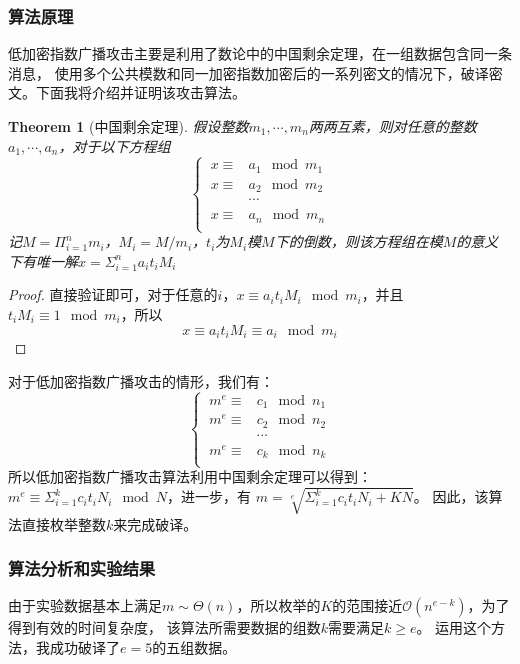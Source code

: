 \documentclass{ctexart}
\newtheorem{theorem}{Theorem}
\begin{document}
\subsubsection{算法原理}
低加密指数广播攻击主要是利用了数论中的中国剩余定理，在一组数据包含同一条消息，
使用多个公共模数和同一加密指数加密后的一系列密文的情况下，破译密文。下面我将介绍并证明该攻击算法。
\begin{theorem}[中国剩余定理]
    假设整数$m_1,\cdots,m_n$两两互素，则对任意的整数$a_1,\cdots,a_n$，对于以下方程组
    \begin{equation*}
        \begin{cases}
        \ x\equiv& a_1 \mod m_1\\
        \ x\equiv& a_2  \mod m_2 \\
        &\cdots\\
        \ x\equiv& a_n \mod m_n  \\
        \end{cases} 
    \end{equation*}
    记$M=\Pi_{i=1}^nm_i$，$M_i=M/m_i$，$t_i$为$M_i$模$M$下的倒数，则该方程组在模$M$的意义下有唯一解$x=\Sigma_{i=1}^na_it_iM_i$
\end{theorem}
\begin{proof}
    直接验证即可，对于任意的$i$，$x\equiv a_it_iM_i\mod m_i$，并且$t_iM_i\equiv 1 \mod m_i$，所以
    $$
    x\equiv a_it_iM_i\equiv a_i  \mod m_i
    $$
\end{proof}
对于低加密指数广播攻击的情形，我们有：
\begin{equation*}
    \begin{cases}
    \ m^e\equiv& c_1 \mod n_1\\
    \ m^e\equiv& c_2  \mod n_2 \\
    &\cdots\\
    \ m^e\equiv& c_k \mod n_k  \\
    \end{cases} 
\end{equation*}
所以低加密指数广播攻击算法利用中国剩余定理可以得到：
$m^e\equiv\Sigma_{i=1}^kc_it_iN_i\mod N$，进一步，有
$m=\sqrt[e]{\Sigma_{i=1}^kc_it_iN_i + KN}$。
因此，该算法直接枚举整数$k$来完成破译。
\subsubsection{算法分析和实验结果}
由于实验数据基本上满足$m\sim \Theta(n)$，所以枚举的$K$的范围接近$\mathcal{O}(n^{e-k})$，为了得到有效的时间复杂度，
该算法所需要数据的组数$k$需要满足$k\geqslant e $。
运用这个方法，我成功破译了$e=5$的五组数据。
\end{document}
